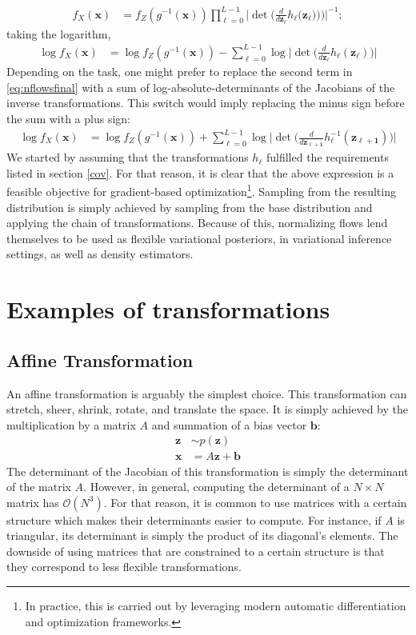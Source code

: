 \begin{align}
         f_X(\bm{x}) &= f_Z(g^{-1}(\bm{x}))\prod_{\ell=0}^{L-1}\Big|\det\Big(\frac{d}{d\bm{z_{\ell}}}h_{\ell}\Big(\bm{z_\ell})\Big)\Big)\Big|^{-1};
\end{align} taking the logarithm,
\begin{align}
    \log f_X(\bm{x}) &= \log f_Z(g^{-1}(\bm{x})) - \sum_{\ell=0}^{L-1} \log \Big|\det\Big(\frac{d}{d\bm{z_{\ell}}}h_{\ell}(\bm{z_\ell})\Big) \Big| \label{eq:nflowsfinal}
\end{align}
Depending on the task, one might prefer to replace the second term in \ref{eq:nflowsfinal}
with a sum of log-absolute-determinants of the Jacobians of the inverse transformations.
This switch would imply replacing the minus sign before the sum with a plus sign:
\begin{align}
    \log f_X(\bm{x}) &= \log f_Z(g^{-1}(\bm{x})) + \sum_{\ell=0}^{L-1} \log \Big|\det\Big(\frac{d}{d\bm{z_{\ell+1}}}h_{\ell}^{-1}(\bm{z_{\ell+1}})\Big) \Big|
\end{align}
We started by assuming that the transformations $h_\ell$ fulfilled the requirements
listed in section \ref{cov}. For that reason, it is clear that the above expression
is a feasible objective for gradient-based optimization\footnote{In practice, this is carried
out by leveraging modern automatic differentiation and optimization frameworks.}.
Sampling from the resulting distribution is simply achieved by sampling from the base
distribution and applying the chain of transformations. Because of this, normalizing
flows lend themselves to be used as flexible variational posteriors, in variational
inference settings, as well as density estimators.

\section{Examples of transformations}
\subsection{Affine Transformation}
An affine transformation is arguably the simplest choice. This transformation can
stretch, sheer, shrink, rotate, and translate the space. It is simply achieved
by the multiplication by a matrix $A$ and summation of a bias vector $\bm{b}$:
\begin{align}
    \bm{z} &\sim p(\bm{z}) \\
    \bm{x} &= A\bm{z} + \bm{b}
\end{align}
The determinant of the Jacobian of this transformation is simply the determinant
of the matrix $A$. However, in general, computing the determinant of a $N \times N$
matrix has $\mathcal{O}(N^3)$. For that reason, it is common to use matrices with
a certain structure which makes their determinants easier to compute. For
instance, if $A$ is triangular, its determinant is simply the product of its
diagonal's elements. The downside of using matrices that are constrained to
a certain structure is that they correspond to less flexible transformations.

